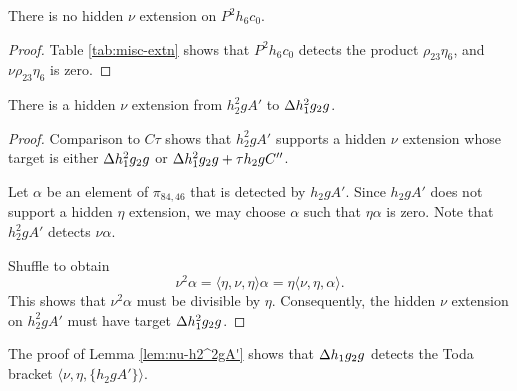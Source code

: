 
\begin{lemma}
\label{lem:nu-P^2h6c0}
There is no hidden $\nu$ extension on $P^2 h_6 c_0$.
\end{lemma}

\begin{proof}
Table \ref{tab:misc-extn} shows that $P^2 h_6 c_0$ 
detects the product $\rho_{23} \eta_6$, and
$\nu \rho_{23} \eta_6$ is zero.
\end{proof}

\begin{lemma}
\label{lem:nu-h2^2gA'}
There is a hidden $\nu$ extension from
$h_2^2 g A'$ to $\Delta h_1^2 g_2 g$.
\end{lemma}

\begin{proof}
Comparison to $C\tau$ shows that $h_2^2 g A'$ supports a hidden
$\nu$ extension whose target is either $\Delta h_1^2 g_2 g$
or $\Delta h_1^2 g_2 g + \tau h_2 g C''$.

Let $\alpha$ be an element of $\pi_{84,46}$ that is detected
by $h_2 g A'$.  Since $h_2 g A'$ does not support a hidden
$\eta$ extension, we may choose $\alpha$ such that $\eta \alpha$ is
zero.  Note that $h_2^2 g A'$ detects $\nu \alpha$.

Shuffle to obtain
\[
\nu^2 \alpha = \langle \eta, \nu, \eta \rangle \alpha =
\eta \langle \nu, \eta, \alpha \rangle.
\]
This shows that $\nu^2 \alpha$ must be divisible by $\eta$.
Consequently, the hidden $\nu$ extension on 
$h_2^2 g A'$ must have target $\Delta h_1^2 g_2 g$.
\end{proof}

\begin{remark}
\label{rem:nu,eta,h2gA'}
The proof of Lemma \ref{lem:nu-h2^2gA'} shows that
$\Delta h_1 g_2 g$ detects the Toda bracket
$\langle \nu, \eta, \{h_2 g A'\} \rangle$.
\end{remark}

